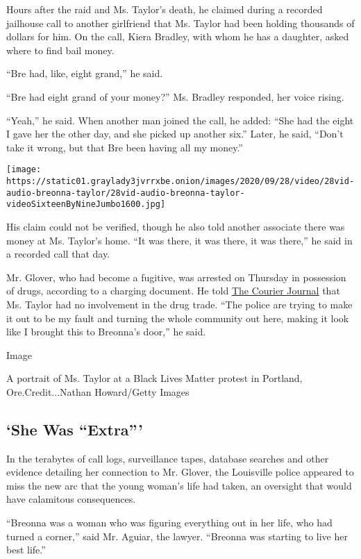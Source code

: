Hours after the raid and Ms. Taylor's death, he claimed during a
recorded jailhouse call to another girlfriend that Ms. Taylor had been
holding thousands of dollars for him. On the call, Kiera Bradley, with
whom he has a daughter, asked where to find bail money.

``Bre had, like, eight grand,'' he said.

``Bre had eight grand of your money?'' Ms. Bradley responded, her voice
rising.

``Yeah,'' he said. When another man joined the call, he added: ``She had
the eight I gave her the other day, and she picked up another six.''
Later, he said, ``Don't take it wrong, but that Bre been having all my
money.''

\texttt{[image: https://static01.graylady3jvrrxbe.onion/images/2020/09/28/video/28vid-audio-breonna-taylor/28vid-audio-breonna-taylor-videoSixteenByNineJumbo1600.jpg]}

His claim could not be verified, though he also told another associate
there was money at Ms. Taylor's home. ``It was there, it was there, it
was there,'' he said in a recorded call that day.

Mr. Glover, who had become a fugitive, was arrested on Thursday in
possession of drugs, according to a charging document. He told
\href{https://www.courier-journal.com/story/news/local/breonna-taylor/2020/08/27/breonna-taylor-had-no-ties-drugs-ex-boyfriend-says/5641151002/}{The
Courier Journal} that Ms. Taylor had no involvement in the drug trade.
``The police are trying to make it out to be my fault and turning the
whole community out here, making it look like I brought this to
Breonna's door,'' he said.

Image

A portrait of Ms. Taylor at a Black Lives Matter protest in Portland,
Ore.Credit...Nathan Howard/Getty Images

\hypertarget{she-was-extra}{%
\subsection{`She Was ``Extra'''}\label{she-was-extra}}

In the terabytes of call logs, surveillance tapes, database searches and
other evidence detailing her connection to Mr. Glover, the Louisville
police appeared to miss the new arc that the young woman's life had
taken, an oversight that would have calamitous consequences.

``Breonna was a woman who was figuring everything out in her life, who
had turned a corner,'' said Mr. Aguiar, the lawyer. ``Breonna was
starting to live her best life.''

